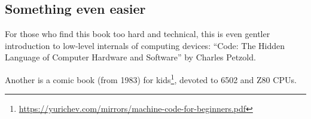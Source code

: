 

\subsection{Something even easier}

For those who find this book too hard and technical,
this is even gentler introduction to low-level internals of computing devices:
``Code: The Hidden Language of Computer Hardware and Software'' by Charles Petzold.

Another is 
a comic book (from 1983) for kids\footnote{\url{https://yurichev.com/mirrors/machine-code-for-beginners.pdf}},
devoted to 6502 and Z80 CPUs.


